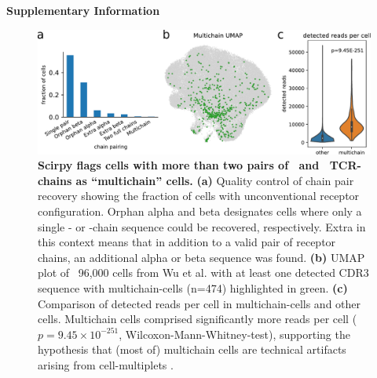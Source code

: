 \documentclass{article}
\begin{document}
\begin{center}
    \normalfont\Large\bfseries{Supplementary Information}
\end{center}
\vspace*{60pt}

\begin{figure}[!hb]
  \centering
  \includegraphics[width=7in]{multichains.pdf}
  \caption{\textbf{Scirpy flags cells with more than two pairs of \textalpha\ and \textbeta\ TCR-chains as “multichain” cells.} \textbf{(a)} Quality control of chain pair recovery showing the fraction of cells with unconventional receptor configuration. Orphan alpha and beta designates cells where only a single \textalpha- or \textbeta-chain sequence could be recovered, respectively. Extra in this context means that in addition to a valid pair of receptor chains, an additional alpha or beta sequence was found. \textbf{(b)} UMAP plot of ~96,000 cells from Wu et al. \cite{Wu2020-vp} with at least one detected CDR3 sequence with multichain-cells (n=474) highlighted in green. \textbf{(c)} Comparison of detected reads per cell in multichain-cells and other cells. Multichain cells comprised significantly more reads per cell ($p=9.45 \times 10^{-251}$, Wilcoxon-Mann-Whitney-test), supporting the hypothesis that (most of) multichain cells are technical artifacts arising from cell-multiplets \cite{Ilicic2016-ny}. }
\end{figure}
\end{document}
